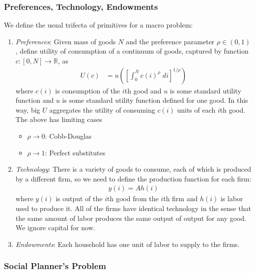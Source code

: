 \documentclass[12pt]{article}
\theoremstyle{plain}
\theoremstyle{definition}
\theoremstyle{remark}
\newcommand{\ra}{\rightarrow}
\newcommand{\R}{\mathbb{R}}
\begin{document}
\subsubsection{Preferences, Technology, Endowments}

We define the usual trifecta of primitives for a macro problem:
\begin{enumerate}
  \item \emph{Preferences}:
    Given mass of goods $N$ and the preference parameter $\rho\in(0,1)$,
    define utility of consumption of a continuum of goods, captured by
    function $c:[0,N]\ra \R$, as
    \begin{align*}
      U(c) &=
      u\left(
      \left[
      \int_0^N c(i)^\rho \; di
      \right]^{1/\rho}
      \right)
    \end{align*}
    where $c(i)$ is consumption of the $i$th good and $u$ is some
    standard utility function and $u$ is some standard utility function
    defined for one good. In this way, big $U$ aggregates the utility of
    consuming $c(i)$ units of each $i$th good.  The above has limiting
    cases
    \begin{itemize}
      \item $\rho\ra 0$: Cobb-Douglas
      \item $\rho\ra 1$: Perfect substitutes
    \end{itemize}

  \item \emph{Technology}:
    There is a variety of goods to consume, each of which is produced by
    a different firm, so we need to define the production function for
    each firm:
    \begin{align*}
      y(i) = A h(i)
    \end{align*}
    where $y(i)$ is output of the $i$th good from the $i$th firm and
    $h(i)$ is labor used to produce it. All of the firms have identical
    technology in the sense that the same amount of labor produces the
    same output of output for any good. We ignore capital for now.

  \item \emph{Endowments}: Each household has one unit of labor to
    supply to the firms.
\end{enumerate}

\clearpage
\subsubsection{Social Planner's Problem}
\end{document}
